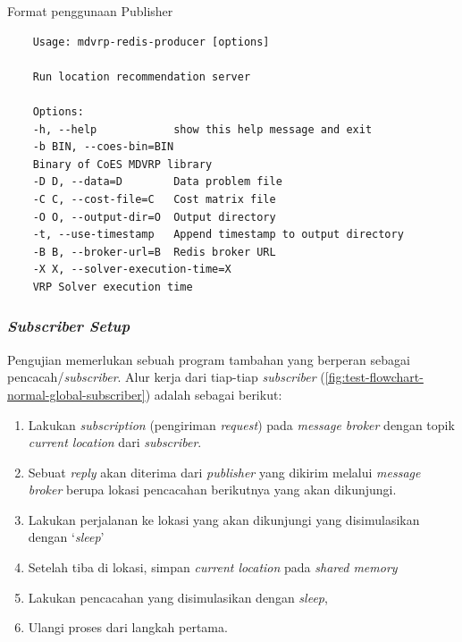 \begin{listing}[!]
	\caption{Format penggunaan Publisher}
	\label{lst:publisher-usage}
	\begin{verbatim}
	Usage: mdvrp-redis-producer [options]
	
	Run location recommendation server
	
	Options:
	-h, --help            show this help message and exit
	-b BIN, --coes-bin=BIN
	Binary of CoES MDVRP library
	-D D, --data=D        Data problem file
	-C C, --cost-file=C   Cost matrix file
	-O O, --output-dir=O  Output directory
	-t, --use-timestamp   Append timestamp to output directory
	-B B, --broker-url=B  Redis broker URL
	-X X, --solver-execution-time=X
	VRP Solver execution time
	\end{verbatim}
\end{listing}


\subsubsection{\textit{Subscriber Setup}}
\label{sssec:subscriber-setup}
Pengujian memerlukan sebuah program tambahan yang berperan sebagai pencacah/\textit{subscriber}. Alur kerja dari tiap-tiap \textit{subscriber} (\autoref{fig:test-flowchart-normal-global-subscriber}) adalah sebagai berikut:


\begin{enumerate}
	\item Lakukan \textit{subscription} (pengiriman \textit{request}) pada \textit{message broker} dengan topik \textit{current location} dari \textit{subscriber}. 
	\item Sebuat \textit{reply} akan diterima dari \textit{publisher} yang dikirim melalui \textit{message broker} berupa lokasi pencacahan berikutnya yang akan dikunjungi. 
	\item Lakukan perjalanan ke lokasi yang akan dikunjungi yang disimulasikan dengan `\textit{sleep}'
	\item Setelah tiba di lokasi, simpan \textit{current location} pada \textit{shared memory} 
	\item Lakukan pencacahan yang disimulasikan dengan \textit{sleep}, 
	\item Ulangi proses dari langkah pertama.
\end{enumerate}


